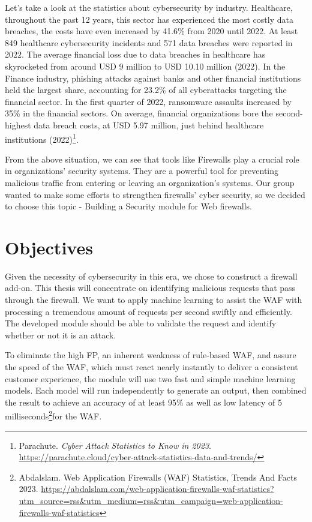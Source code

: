 Let's take a look at the statistics about cybersecurity by industry. Healthcare, throughout the past 12 years, this sector has experienced the most costly data breaches, the costs have even increased by 41.6\% from 2020 until 2022. At least 849 healthcare cybersecurity incidents and 571 data breaches were reported in 2022. The average financial loss due to data breaches in healthcare has skyrocketed from around USD 9 million to USD 10.10 million (2022). In the Finance industry, phishing attacks against banks and other financial institutions held the largest share, accounting for 23.2\% of all cyberattacks targeting the financial sector. In the first quarter of 2022, ransomware assaults increased by 35\% in the financial sectors. On average, financial organizations bore the second-highest data breach costs, at USD 5.97 million, just behind healthcare institutions (2022)\footnote{Parachute. \textit{Cyber Attack Statistics to Know in 2023}. \url{https://parachute.cloud/cyber-attack-statistics-data-and-trends/}}. 

From the above situation, we can see that tools like Firewalls play a crucial role in organizations' security systems. They are a powerful tool for preventing malicious traffic from entering or leaving an organization’s systems. Our group wanted to make some efforts to strengthen firewalls' cyber security, so we decided to choose this topic - Building a Security module for Web firewalls.
\section{Objectives}
\label{sec:objectives}
Given the necessity of cybersecurity in this era, we chose to construct a firewall add-on. This thesis will concentrate on identifying malicious requests that pass through the firewall. We want to apply machine learning to assist the WAF with processing a tremendous amount of requests per second swiftly and efficiently. The developed module should be able to validate the request and identify whether or not it is an attack.

To eliminate the high FP, an inherent weakness of rule-based WAF, and assure the speed of the WAF, which must react nearly instantly to deliver a consistent customer experience, the module will use two fast and simple machine learning models. Each model will run independently to generate an output, then combined the result to achieve an accuracy of at least 95\% as well as low latency of 5 milliseconds\footnote{Abdalslam. Web Application Firewalls (WAF) Statistics, Trends And Facts 2023. \url{https://abdalslam.com/web-application-firewalls-waf-statistics?utm_source=rss&utm_medium=rss&utm_campaign=web-application-firewalls-waf-statistics}}for the WAF.

